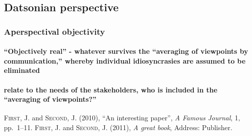 \documentclass{lps}
\begin{document}
\subsection{Datsonian perspective}

\subsubsection{Aperspectival objectivity}

\paragraph{``Objectively real'' - whatever survives the ``averaging of viewpoints
by communication,'' whereby individual idiosyncrasies are assumed to be
eliminated}

\paragraph{relate to the needs of the stakeholders, who is included in the
``averaging of viewpoints?''}





\begin{thebibliography}{AAA}
 \textsc{First, J.} and \textsc{Second, J.} (2010), ``An interesting paper'', \emph{A Famous Journal}, 1, pp.~1--11.
 \textsc{First, J.} and \textsc{Second, J.} (2011), \emph{A great book}, Address: Publisher.
\end{thebibliography}
\end{document}
